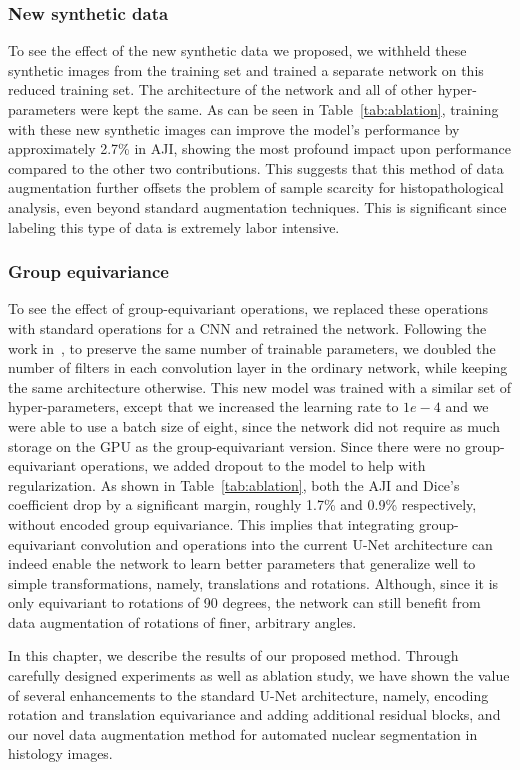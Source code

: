 \subsubsection*{New synthetic data}
To see the effect of the new synthetic data we proposed, we withheld these synthetic images from the training set and trained a separate network on this reduced training set.
The architecture of the network and all of other hyper-parameters were kept the same.
As can be seen in Table~\ref{tab:ablation}, training with these new synthetic images can improve the model's performance by approximately 2.7\% in AJI, showing the most profound impact upon performance compared to the other two contributions.
This suggests that this method of data augmentation further offsets the problem of sample scarcity for histopathological analysis, even beyond standard augmentation techniques.
This is significant since labeling this type of data is extremely labor intensive.

\subsubsection*{Group equivariance}
To see the effect of group-equivariant operations, we replaced these operations with standard operations for a CNN and retrained the network. 
Following the work in~\cite{gcnn}, to preserve the same number of trainable parameters, we doubled the number of filters in each convolution layer in the ordinary network, while keeping the same architecture otherwise.
This new model was trained with a similar set of hyper-parameters, except that we increased the learning rate to $1e-4$ and we were able to use a batch size of eight, since the network did not require as much storage on the GPU as the group-equivariant version.
Since there were no group-equivariant operations, we added dropout to the model to help with regularization.
As shown in Table~\ref{tab:ablation}, both the AJI and Dice's coefficient drop by a significant margin, roughly 1.7\% and 0.9\% respectively, without encoded group equivariance.
This implies that integrating group-equivariant convolution and operations into the current U-Net architecture can indeed enable the network to learn better parameters that generalize well to simple transformations, namely, translations and rotations.
Although, since it is only equivariant to rotations of 90 degrees, the network can still benefit from data augmentation of rotations of finer, arbitrary angles.



\begin{ChapAbstract}
In this chapter, we describe the results of our proposed method. Through carefully designed experiments as well as ablation study, we have shown the value of several enhancements to the standard U-Net architecture, namely, encoding rotation and translation equivariance and adding additional residual blocks, and our novel data augmentation
method for automated nuclear segmentation in histology
images.
\end{ChapAbstract}